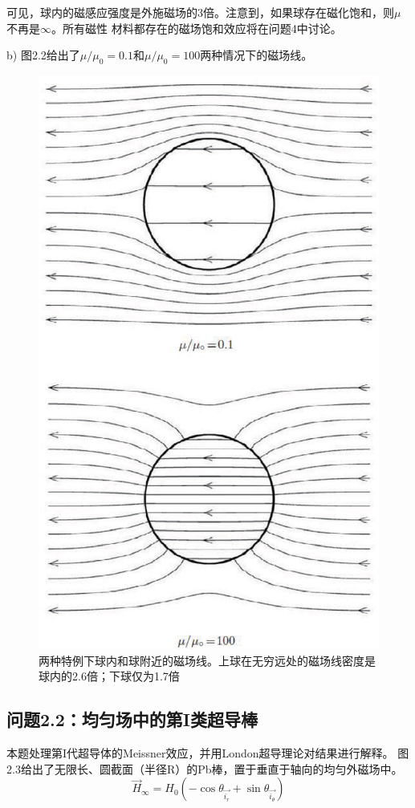 可见，球内的磁感应强度是外施磁场的3倍。注意到，如果球存在磁化饱和，则$\mu$不再是$\infty$。所有磁性
材料都存在的磁场饱和效应将在问题4中讨论。

b) 图2.2给出了$\mu/\mu_0=0.1$和$\mu/\mu_0=100$两种情况下的磁场线。

\begin{figure}
  \centering
 \includegraphics[scale=0.4]{chpt2/figs/fig2.2.eps}
  \caption{两种特例下球内和球附近的磁场线。上球在无穷远处的磁场线密度是球内的2.6倍；下球仅为1.7倍}
\end{figure}

\subsection{问题2.2：均匀场中的第I类超导棒}
本题处理第I代超导体的Meissner效应，并用London超导理论对结果进行解释。
图2.3给出了无限长、圆截面（半径R）的Pb棒，置于垂直于轴向的均匀外磁场中。
\begin{equation*}\label{eqn:2.40}
  \vec{H}_\infty = H_0 (-\cos \theta_{\vec{i_r}}+\sin\theta_{\vec{i_\theta}})
\end{equation*}

